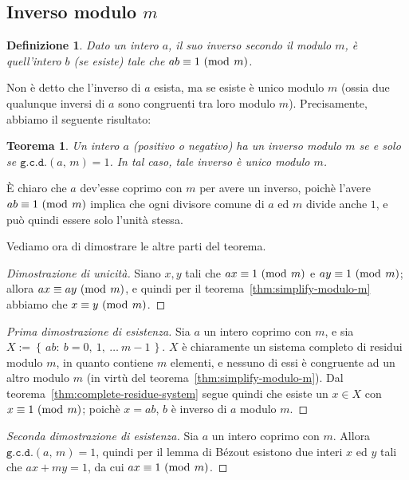 \documentclass[pdflatex,11pt,a4paper,oneside]{article}
\newcommand{\congruent}[0]{\equiv}
\newcommand{\mmodop}[0]{\ensuremath{\operatorname{mod}}}
\newcommand{\mmod}[1]{\ensuremath{\allowbreak\ (\mmodop\:{#1})}}
\newcommand{\set}[1]{\ensuremath{\left\{\,{#1}\,\right\}}}
\newcommand{\setdef}[2]{\set{{#1}:\:{#2}}}
\newcommand{\gcdop}[0]{\ensuremath{\mathtt{g.c.d.}}}
\newcommand{\xgcd}[1]{\ensuremath{\gcdop\left({#1}\right)}}
\renewcommand{\gcd}[2]{\xgcd{{#1},\,{#2}}}
\newtheorem{theorem}[TheoremLike]{Teorema}
\newtheorem{definition}[TheoremLike]{Definizione}
\begin{document}

\subsection{Inverso modulo $m$}

\begin{definition}
Dato un intero $a$, il suo inverso secondo il modulo $m$, \`e quell'intero
$b$ (se esiste) tale che $ab \congruent 1 \mmod m$.
\end{definition}

Non \`e detto che l'inverso di $a$ esista, ma se esiste \`e unico modulo $m$
(ossia due qualunque inversi di $a$ sono congruenti tra loro modulo $m$).
Precisamente, abbiamo il seguente risultato:

\begin{theorem}
Un intero $a$ (positivo o negativo) ha un inverso modulo $m$ se e solo se
$\gcd{a}{m} = 1$.  In tal caso, tale inverso \`e unico modulo $m$.
\end{theorem}

\`E chiaro che $a$ dev'esse coprimo con $m$ per avere un inverso, poich\`e
l'avere $ab \congruent 1 \mmod m$ implica che ogni divisore comune di $a$
ed $m$ divide anche $1$, e pu\`o quindi essere solo l'unit\`a stessa.

\medskip\noindent
Vediamo ora di dimostrare le altre parti del teorema.

\begin{proof}[Dimostrazione di unicit\`a]
Siano $x, y$ tali che $ax \congruent 1 \mmod m$ e $ay \congruent 1
\mmod m$; allora $ax \congruent ay \mmod m$, e quindi per il
teorema~\eqref{thm:simplify-modulo-m} abbiamo che $x \congruent y
\mmod m$.
\end{proof}

\begin{proof}[Prima dimostrazione di esistenza]
Sia $a$ un intero coprimo con $m$, e sia $X := \setdef{ab}{b = 0,\: 1,\:
\ldots\: m - 1}$. $X$ \`e chiaramente un sistema completo di residui modulo
$m$, in quanto contiene $m$ elementi, e nessuno di essi \`e congruente ad
un altro modulo $m$ (in virt\`u del teorema~\eqref{thm:simplify-modulo-m}).
Dal teorema~\eqref{thm:complete-residue-system} segue quindi che esiste un
$x \in X$ con $x \congruent 1 \mmod m$; poich\`e $x = ab$, $b$ \`e inverso
di $a$ modulo $m$.
\end{proof}

\begin{proof}[Seconda dimostrazione di esistenza]
Sia $a$ un intero coprimo con $m$.  Allora $\gcd{a}{m} = 1$, quindi per il
lemma di B\'ezout esistono due interi $x$ ed $y$ tali che $ax + my = 1$,
da cui $ax \congruent 1 \mmod m$.
\end{proof}
\end{document}

